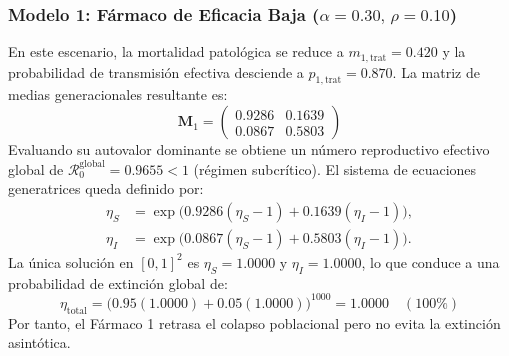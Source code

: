 \documentclass[graybox]{SNmult}
\begin{document}
	\subsubsection{Modelo 1: Fármaco de Eficacia Baja ($\alpha = 0.30, \, \rho = 0.10$)}
	En este escenario, la mortalidad patológica se reduce a $m_{1,\text{trat}} = 0.420$ y la probabilidad de transmisión efectiva desciende a $p_{1,\text{trat}} = 0.870$. La matriz de medias generacionales resultante es:
	\begin{equation}
		\mathbf{M}_1 = \begin{pmatrix}
			0.9286 & 0.1639 \\
			0.0867 & 0.5803
		\end{pmatrix}
	\end{equation}
	Evaluando su autovalor dominante se obtiene un número reproductivo efectivo global de $\mathcal{R}_0^{\text{global}} = 0.9655 < 1$ (régimen subcrítico). El sistema de ecuaciones generatrices queda definido por:
	\begin{align}
		\eta_S &= \exp\Big( 0.9286(\eta_S - 1) + 0.1639(\eta_I - 1) \Big), \\
		\eta_I &= \exp\Big( 0.0867(\eta_S - 1) + 0.5803(\eta_I - 1) \Big).
	\end{align}
	La única solución en $[0,1]^2$ es $\eta_S = 1.0000$ y $\eta_I = 1.0000$, lo que conduce a una probabilidad de extinción global de:
	\begin{equation}
		\eta_{\text{total}} = \big( 0.95(1.0000) + 0.05(1.0000) \big)^{1000} = 1.0000 \quad (100\%)
	\end{equation}
	Por tanto, el Fármaco 1 retrasa el colapso poblacional pero no evita la extinción asintótica.
	
\end{document}
